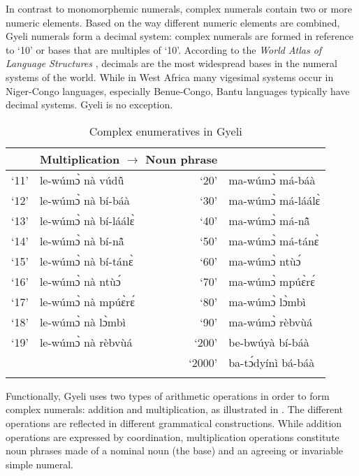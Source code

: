 In contrast to monomorphemic numerals, complex numerals contain two or more numeric elements. Based on the way different numeric elements are combined, Gyeli numerals form a decimal system: complex numerals are formed in reference to `10' or bases that are multiples of `10'. According to the {\itshape World Atlas of Language Structures} \citep{comrie13}, decimals are the most widespread bases in the numeral systems of the world. While in West Africa many vigesimal systems occur in Niger-Congo languages, especially Benue-Congo, Bantu languages typically have decimal systems. Gyeli is no exception.

\begin{table}
\begin{tabular}{rl rl}
 \lsptoprule
 \multicolumn{2}{l}{Addition $\rightarrow$ Coordination} & \multicolumn{2}{l}{Multiplication $\rightarrow$ Noun phrase} \\
  \midrule
 `11' & le-wúmɔ̀ nà vúdũ̂ & `20' & ma-wúmɔ̀ má-báà \\
 `12' & le-wúmɔ̀ nà bí-báà & `30' & ma-wúmɔ̀ má-láálɛ̀ \\
 `13' & le-wúmɔ̀ nà bí-láálɛ̀ & `40' & ma-wúmɔ̀ má-nã̂ \\
 `14' & le-wúmɔ̀ nà bí-nã̂ & `50' & ma-wúmɔ̀ má-tánɛ̀ \\
 `15' & le-wúmɔ̀ nà bí-tánɛ̀ & `60' & ma-wúmɔ̀ ntùɔ́ \\
 `16' & le-wúmɔ̀ nà ntùɔ́ & `70' & ma-wúmɔ̀ mpúɛ̀rɛ́  \\
 `17' & le-wúmɔ̀ nà mpúɛ̀rɛ́ & `80' & ma-wúmɔ̀ lɔ̀mbì \\
 `18' & le-wúmɔ̀ nà lɔ̀mbì & `90' & ma-wúmɔ̀ rèbvùá \\
 `19' & le-wúmɔ̀ nà rèbvùá & `200' & be-bwúyà bí-báà \\
  & & `2000' & ba-tɔ́dyínì bá-báà \\
  \lspbottomrule
\end{tabular}
\caption{Complex enumeratives in Gyeli}
\label{Tab:CompNum}
\end{table}

Functionally, Gyeli uses two types of arithmetic operations in order to form complex numerals: addition and multiplication, as illustrated in . The different operations are reflected in different grammatical constructions. While addition operations are expressed by coordination, multiplication operations constitute noun phrases made of a nominal noun (the base) and an agreeing or invariable simple numeral.

